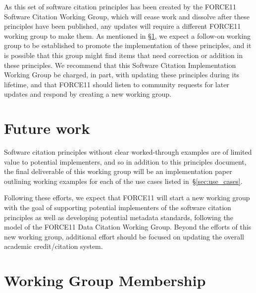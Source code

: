 \documentclass[11pt, oneside]{amsart}
\newcommand{\dmnote}[1]{ {\textcolor{purple} { ***DM: #1 }}} %
\newcommand{\LJHnote}[1]{ {\textcolor{fuschsia} { ***LJH: #1 }}} %
\begin{document}
As this set of software citation principles has been created by the FORCE11 Software Citation Working Group, which will cease work and dissolve after these principles have been published,
any updates will require a different FORCE11 working group to make them.
As mentioned in \S\ref{sec:futurework}, we expect a follow-on working group to be established to promote the implementation of
these principles, and it is possible that this group might find items that need correction or addition
in these principles.
We recommend that this Software Citation Implementation Working Group be charged, in part,
with updating these principles during its lifetime, and that FORCE11 should listen to community requests for later updates and respond by creating a new working group.


\section{Future work}
\label{sec:futurework}

Software citation principles without clear worked-through examples are of
limited value to potential implementers, and so in addition to this principles
document, the final deliverable of this working group will be an implementation
paper outlining working examples for each of the use cases listed in~\S\ref{sec:use_cases}.

Following these efforts, we expect that FORCE11 will start a new working group
with the goal of supporting potential implementers of the software citation
principles as well as developing potential metadata standards, following the model
of the FORCE11 Data Citation Working Group.
Beyond the efforts of this new working group, additional effort should be focused on updating the overall academic credit\slash citation system.


\appendix

\section{Working Group Membership}
\label{app:wg_members}
\end{document}
